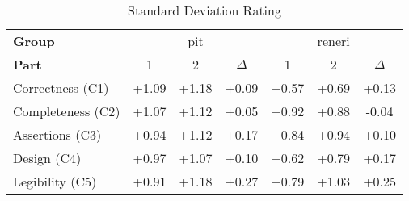\begin{sidewaystable}
\centering
\caption{Standard Deviation Rating}
\label{tab:standard_deviation_rating}
\begin{tabular}{lcccccc}
\toprule
\textbf{Group} & \multicolumn{3}{c}{pit} & \multicolumn{3}{c}{reneri} \\
\textbf{Part} & 1 & 2 & $\Delta$ & 1 & 2 & $\Delta$ \\
\cmidrule(lr){1-1} \cmidrule(lr){2-4} \cmidrule(lr){5-7}
Correctness (C1) & +1.09 & +1.18 & +0.09 & +0.57 & +0.69 & +0.13 \\
Completeness (C2) & +1.07 & +1.12 & +0.05 & +0.92 & +0.88 & -0.04 \\
Assertions (C3) & +0.94 & +1.12 & +0.17 & +0.84 & +0.94 & +0.10 \\
Design (C4) & +0.97 & +1.07 & +0.10 & +0.62 & +0.79 & +0.17 \\
Legibility (C5) & +0.91 & +1.18 & +0.27 & +0.79 & +1.03 & +0.25 \\
\bottomrule
\end{tabular}
\end{sidewaystable}
